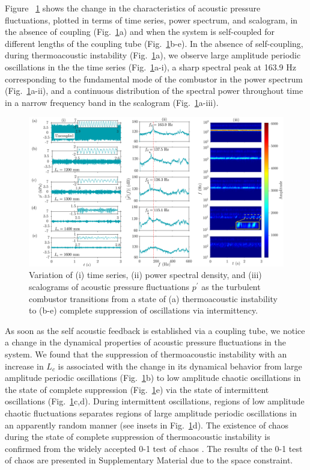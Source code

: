 \documentclass[twocolumn,10pt]{article} %
\begin{document}
 Figure ~\ref{fig3} shows the change in the characteristics of acoustic pressure fluctuations, plotted in terms of time series, power spectrum, and scalogram, in the absence of coupling (Fig.~\ref{fig3}a) and when the system is self-coupled for different lengths of the coupling tube (Fig.~\ref{fig3}b-e). In the absence of self-coupling, during thermoacoustic instability (Fig.~\ref{fig3}a), we observe large amplitude periodic oscillations in the the time series (Fig.~\ref{fig3}a-i), a sharp spectral peak at 163.9 Hz corresponding to the fundamental mode of the combustor in the power spectrum (Fig.~\ref{fig3}a-ii), and a continuous distribution of the spectral power throughout time in a narrow frequency band in the scalogram (Fig.~\ref{fig3}a-iii).

\begin{figure}[t!]
\centering
\includegraphics[width=1\textwidth]{fig3.png}
\caption{Variation of (i) time series, (ii) power spectral density, and (iii) scalograms of acoustic pressure fluctuations $p^\prime$ as the turbulent combustor transitions from a state of (a) thermoacoustic instability to (b-e) complete suppression of oscillations via intermittency.}
\label{fig3}
\end{figure}

As soon as the self acoustic feedback is established via a coupling tube, we notice a change in the dynamical properties of acoustic pressure fluctuations in the system. We found that the suppression of thermoacoustic instability with an increase in $L_c$ is associated with the change in its dynamical behavior from large amplitude periodic oscillations (Fig.~\ref{fig3}b) to low amplitude chaotic oscillations in the state of complete suppression (Fig.~\ref{fig3}e) via the state of intermittent oscillations (Fig.~\ref{fig3}c,d). During intermittent oscillations, regions of low amplitude chaotic fluctuations separates regions of large amplitude periodic oscillations in an apparently random manner (see insets in Fig.~\ref{fig3}d). The existence of chaos during the state of complete suppression of thermoacoustic instability is confirmed from the widely accepted 0-1 test of chaos \cite{gottwald2004new}. The results of the 0-1 test of chaos are presented in Supplementary Material due to the space constraint. 
\end{document}
